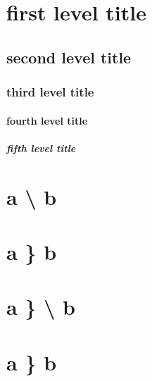 \chapter{first level title}
\section{second level title}
\subsection{third level title}
\subsubsection{fourth level title}
\paragraph{fifth level title}
\chapter{a \textbackslash{} b}
\chapter{a \} b}
\chapter{a \} \textbackslash{} b}
\chapter{a \} b}
